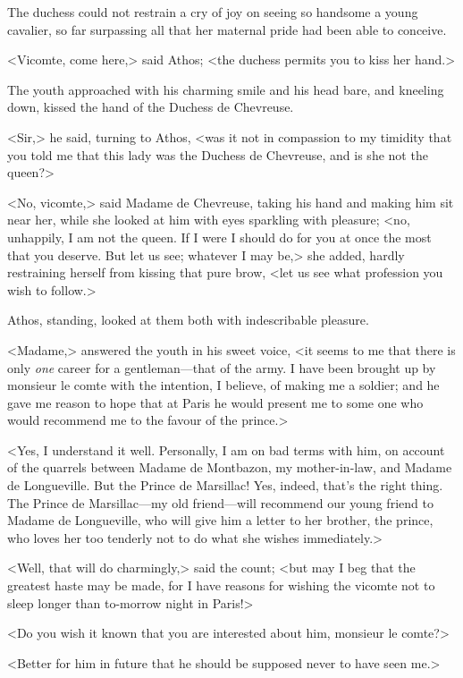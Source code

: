 The duchess could not restrain a cry of joy on seeing so handsome a young cavalier, so far surpassing all that her maternal pride had been able to conceive.

<Vicomte, come here,> said Athos; <the duchess permits you to kiss her hand.>

The youth approached with his charming smile and his head bare, and kneeling down, kissed the hand of the Duchess de Chevreuse.

<Sir,> he said, turning to Athos, <was it not in compassion to my timidity that you told me that this lady was the Duchess de Chevreuse, and is she not the queen?>

<No, vicomte,> said Madame de Chevreuse, taking his hand and making him sit near her, while she looked at him with eyes sparkling with pleasure; <no, unhappily, I am not the queen. If I were I should do for you at once the most that you deserve. But let us see; whatever I may be,> she added, hardly restraining herself from kissing that pure brow, <let us see what profession you wish to follow.>

Athos, standing, looked at them both with indescribable pleasure.

<Madame,> answered the youth in his sweet voice, <it seems to me that there is only \emph{one} career for a gentleman—that of the army. I have been brought up by monsieur le comte with the intention, I believe, of making me a soldier; and he gave me reason to hope that at Paris he would present me to some one who would recommend me to the favour of the prince.>

<Yes, I understand it well. Personally, I am on bad terms with him, on account of the quarrels between Madame de Montbazon, my mother-in-law, and Madame de Longueville. But the Prince de Marsillac! Yes, indeed, that's the right thing. The Prince de Marsillac—my old friend—will recommend our young friend to Madame de Longueville, who will give him a letter to her brother, the prince, who loves her too tenderly not to do what she wishes immediately.>

<Well, that will do charmingly,> said the count; <but may I beg that the greatest haste may be made, for I have reasons for wishing the vicomte not to sleep longer than to-morrow night in Paris!>

<Do you wish it known that you are interested about him, monsieur le comte?>

<Better for him in future that he should be supposed never to have seen me.>

